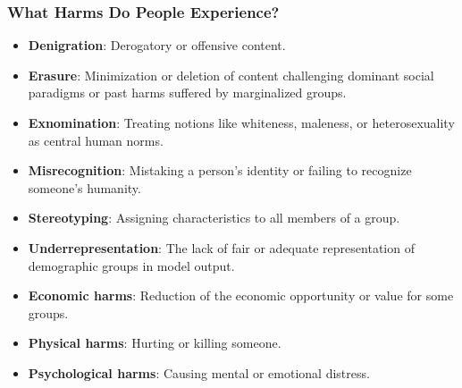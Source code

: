 \documentclass[11pt,aspectratio=169,hyperref={colorlinks}]{beamer}
\begin{document}
		\begin{frame}[t, allowframebreaks]				

			\frametitle{What Harms Do People Experience?}

			\begin{itemize} \small
				\item \textbf{Denigration}: Derogatory or offensive content.
				\item \textbf{Erasure}: Minimization or deletion of content challenging dominant social paradigms or past harms suffered by marginalized groups.
				\item \textbf{Exnomination}: Treating notions like whiteness, maleness, or heterosexuality as central human norms.
				\item \textbf{Misrecognition}: Mistaking a person’s identity or failing to recognize someone’s humanity.
				\item \textbf{Stereotyping}: Assigning characteristics to all members of a group.
				\item \textbf{Underrepresentation}: The lack of fair or adequate representation of demographic groups in model output.
				\item \textbf{Economic harms}: Reduction of the economic opportunity or value for some groups.
				\item \textbf{Physical harms}: Hurting or killing someone.  
				\item \textbf{Psychological harms}: Causing mental or emotional distress.

			\end{itemize}
		\end{frame}

			
			
			
			
\end{document}
